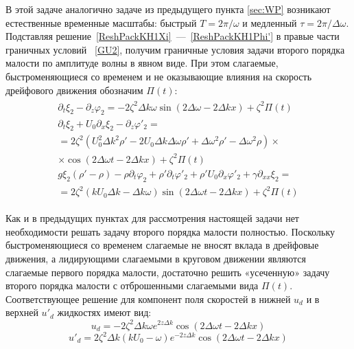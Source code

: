 В этой задаче аналогично задаче из предыдущего пункта \ref{sec:WP} возникают естественные временные масштабы: быстрый $ T=2\pi/\omega $  и медленный  $ \tau = 2\pi/\Delta \omega $. Подставляя решение~\eqref{ReshPackKH1Xi}~---~\eqref{ReshPackKH1Phi'} в правые части граничных условий ~\eqref{GU2},  получим граничные условия задачи второго порядка малости по амплитуде волны в явном виде. При этом слагаемые, быстроменяющиеся со временем и не оказывающие влияния на скорость дрейфового движения обозначим  $ \Pi \left( t \right) $:
\begin{gather}
\begin{gathered}
\partial_{t}\xi_{2}-\partial_{z}\varphi_{2}=-2\zeta^{2}\Delta k \omega \sin \left( 2 \Delta \omega - 2 \Delta k x \right) +\zeta^{2} \Pi \left( t \right)\\
\partial_{t}\xi_{2}+U_{0}\partial_{x}\xi_{2}-\partial_{z}\varphi'_{2}=\\
=2 \zeta^{2} \left( U_{0}^{2}\Delta k^{2}\rho'-2U_{0}\Delta k \Delta \omega \rho' +\Delta \omega^{2} \rho' - \Delta \omega^{2} \rho \right) \times\\
\times \cos \left( 2 \Delta \omega t - 2 \Delta k x \right) + \zeta^{2} \Pi \left( t \right)\\
g \xi_{2} \left( \rho' - \rho \right) - \rho \partial_{t} \varphi_{2} + \rho' \partial_{t} \varphi'_{2} + \rho' U_{0} \partial_{x} \varphi'_{2}+\gamma \partial_{xx}\xi_{2}=\\
=2 \zeta^{2} \left( k U_{0}\Delta k - \Delta k \omega \right) \sin \left( 2 \Delta \omega t - 2 \Delta k x \right) + \zeta^{2} \Pi \left( t \right)
\label{RPPacketKH}
\end{gathered}
\end{gather}
	  		  	
Как и в предыдущих пунктах для рассмотрения настоящей задачи нет необходимости решать задачу второго порядка малости полностью. Поскольку быстроменяющиеся со временем слагаемые не вносят вклада в дрейфовые движения, а лидирующими слагаемыми в круговом движении являются слагаемые первого порядка малости, достаточно решить «усеченную» задачу второго порядка малости с отброшенными слагаемыми вида  $ \Pi \left(t \right) $. Соответствующее решение для компонент поля скоростей в нижней $ u_{d} $  и в верхней $ u'_{d} $  жидкостях имеют вид:
\begin{equation}
u_{d}=-2\zeta^{2}\Delta k \omega e^{2 z \Delta k} \cos \left( 2 \Delta \omega t-2 \Delta k x \right)
\label{udPacketKH}
\end{equation}
\begin{equation}
u'_{d}=2\zeta^{2}\Delta k\left( k U_{0}- \omega \right) e^{-2 z \Delta k} \cos \left( 2 \Delta \omega t-2 \Delta k x \right)
\label{ud'PacketKH}
\end{equation}
	  		  	
